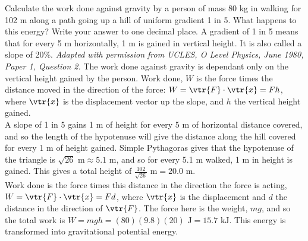 
\begin{hint}[O1980PIQ2a]%
{Calculate the work done against gravity by a person of mass 80 kg in walking for 102 m along a path going up a hill of uniform gradient 1 in 5. What happens to this energy? Write your answer to one decimal place.}
{A gradient of 1 in 5 means that for every 5 m horizontally, 1 m is gained in vertical height. It is also called a slope of 20\%.} 
{\textit{Adapted with permission from UCLES, O Level Physics, June 1980, Paper 1, Question 2.}}
{The work done against gravity is dependant only on the vertical height gained by the person. Work done, $W$ is the force times the distance moved in the direction of the force: $W = \vtr{F}\cdot\vtr{x} = Fh$, where $\vtr{x}$ is the displacement vector up the slope, and $h$ the vertical height gained. \\

A slope of 1 in 5 gains 1 m of height for every 5 m of horizontal distance covered, and so the length of the hypotenuse will give the distance along the hill covered for every 1 m of height gained. Simple Pythagoras gives that the hypotenuse of the triangle is $\sqrt{26} \textrm{ m} \approx 5.1 \textrm{ m}$, and so for every 5.1 m walked, 1 m in height is gained. This gives a total height of $\frac{102}{\sqrt{26}} \textrm{ m} = 20.0 \textrm{ m}$.\\

Work done is the force times this distance in the direction the force is acting, $W = \vtr{F}\cdot\vtr{x} = Fd$, where $\vtr{x}$ is the displacement and $d$ the distance in the direction of $\vtr{F}$. The force here is the weight, $mg$, and so the total work is $W = mgh = (80)(9.8)(20) \textrm{ J} = 15.7 \textrm{ kJ}$. This energy is transformed into gravitational potential energy.
}
\end{hint}